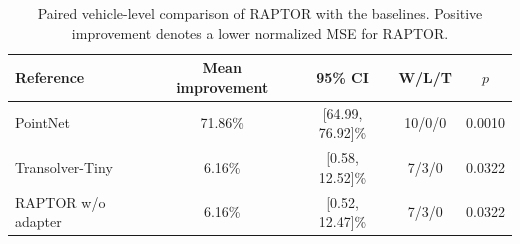 \begin{table}[t]
\centering
\caption{Paired vehicle-level comparison of RAPTOR with the baselines. Positive improvement denotes a lower normalized MSE for RAPTOR.}
\label{tab:car_paired}
\small
\begin{tabular}{lcccc}
\toprule
Reference & Mean improvement & 95\% CI & W/L/T & $p$ \\
\midrule
PointNet & 71.86\% & [64.99, 76.92]\% & 10/0/0 & 0.0010 \\
Transolver-Tiny & 6.16\% & [0.58, 12.52]\% & 7/3/0 & 0.0322 \\
RAPTOR w/o adapter & 6.16\% & [0.52, 12.47]\% & 7/3/0 & 0.0322 \\
\bottomrule
\end{tabular}
\end{table}